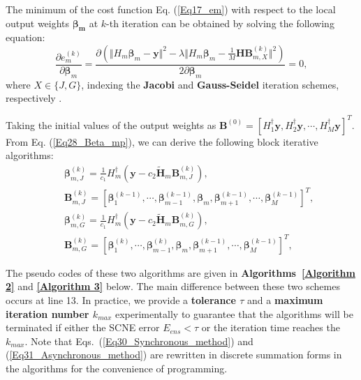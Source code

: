 \documentclass{article}
\begin{document}
The minimum of the cost function Eq. (\ref{Eq17_em}) with respect to the local output weights $\bm{\beta_m}$  at $k$-th iteration  can be obtained by solving the following equation: 
\begin{equation}
\label{Eq28_Beta_mp}
\frac{\partial e_{m}^{(k)}}{\partial  \bm{\beta}_m}=  
\frac{\partial \left( \Vert H_m \bm{\beta}_m - \bm{y} \Vert^2 - \lambda \Vert H_m \bm{\beta}_m - \frac{1}{M} \bm{H} \bm{B}_{m,X}^{(k)} \Vert ^2 \right) }{ 2 \partial \bm{\beta}_m} = 0,
\end{equation} 
where $X\in \{J,G\}$, indexing the \textbf{Jacobi} and  \textbf{Gauss-Seidel} iteration schemes, respectively \cite{young1971Iterative}.

Taking the initial values of the output weights as $\bm{B}^{(0)} = \left[H_1^{\dagger}\bm{y},H_2^{\dagger}\bm{y},\cdots, H_M^{\dagger}\bm{y} \right]^T$. From Eq. (\ref{Eq28_Beta_mp}), we can derive the following block iterative algorithms:
\begin{eqnarray}
&&\bm{\beta}_{m,J}^{(k)} = \frac{1}{c_1}H_m^{\dagger} \left( \bm{y} - c_2 \bm{\tilde{H}}_m\bm{B}_{m,J}^{(k)}\right), \label{Eq30_Synchronous_method}
\\  
&&\bm{B}_{m,J}^{(k)} = \left[
\bm{\beta}_1^{(k-1)},  
\cdots,
\bm{\beta}_{m-1}^{(k-1)},
\bm{\beta}_{m},
\bm{\beta}_{m+1}^{(k-1)},
\cdots,
\bm{\beta}_M^{(k-1)}
\right]^T, \\
&&\bm{\beta}_{m,G}^{(k)} = \frac{1}{c_1}H_m^{\dagger} \left( \bm{y} - c_2 \bm{\tilde{H}}_m\bm{B}_{m,G}^{(k)}\right), \label{Eq31_Asynchronous_method}
\\
&&\bm{B}_{m,G}^{(k)} = \left[
\bm{\beta}_1^{(k)},
\cdots,
\bm{\beta}_{m-1}^{(k)},
\bm{\beta}_{m},
\bm{\beta}_{m+1}^{(k-1)},
\cdots,
\bm{\beta}_M^{(k-1)}
\right]^T,
\end{eqnarray}

The pseudo codes of these two algorithms are given in \textbf{Algorithms~\ref{Algorithm 2}} and \textbf{\ref{Algorithm 3}} below. 
The main difference between these two schemes occurs at line 13. In practice, we provide a \textbf{tolerance $\tau$} and a \textbf{ maximum iteration number $k_{max}$ } experimentally to guarantee that the algorithms will be terminated if either the SCNE error $E_{ens} < \tau$ or the iteration time reaches the $k_{max}$. Note that Eqs.~(\ref{Eq30_Synchronous_method}) and (\ref{Eq31_Asynchronous_method}) are rewritten in discrete summation forms in the algorithms for the convenience of programming.
\end{document}
